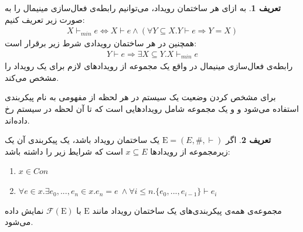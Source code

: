 \documentclass[
msc,
irfonts
]{./tex/tehran-thesis}
\newcommand{\پ}{پروژه/پایان‌نامه/رساله }
\theoremstyle{definition}
\newtheorem{definition}{تعریف}[section]
\theoremstyle{theorem}
\theoremstyle{definition}
\numberwithin{algorithm}{chapter}
\newcommand{\s}[1]{\{#1\}}
\newcommand{\lf}[1]{\LTRfootnote{#1}}
\begin{document}
\begin{definition}
    به ازای هر ساختمان رویداد، می‌توانیم رابطه‌ی فعال‌سازی مینیمال را به صورت زیر تعریف کنیم:
    \begin{align*}
        X \vdash_{min} e \iff X \vdash e \wedge
        ( \forall Y \subseteq X . Y \vdash e \Rightarrow Y = X )
    \end{align*}
    همچنین در هر ساختمان رویدادی شرط زیر برقرار است:
    \begin{align*}
        Y \vdash e \Rightarrow \exists X \subseteq Y . X \vdash_{min} e
    \end{align*}
    رابطه‌ی فعال‌سازی مینیمال در واقع یک مجموعه‌ از رویداد‌های 
    لازم برای یک رویداد را مشخص می‌کند.
\end{definition}

برای مشخص کردن وضعیت یک سیستم در هر لحظه از مفهومی به نام پیکر‌بندی\lf{Configuration}
استفاده می‌شود و
و یک مجموعه شامل رویدادهایی است که تا آن لحظه در سیستم رخ داده‌اند.
\begin{definition}
    \label{def:configuration}
    اگر
    $\mathrm{E} = (E,\#,\vdash)$
    یک ساختمان رویداد باشد، یک پیکربندی آن یک زیرمجموعه از رویداد‌ها
    $x \subseteq E$
    است که شرایط زیر را داشته باشد:
    \begin{enumerate}
        \item $x \in Con$
        \item $\forall e \in x. \exists e_0,...,e_n \in x. e_n = e \ \wedge
                  \forall i \leq n. \s{e_0,...,e_{i-1}} \vdash e_i$
    \end{enumerate}
\end{definition}
مجموعه‌ی همه‌ی پیکربندی‌های یک ساختمان رویداد مانند
$\mathrm{E}$
با
$\mathcal{F}(\mathrm{E})$
نمایش داده می‌شود.
\end{document}

